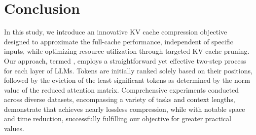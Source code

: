 \section{Conclusion}

In this study, we introduce an innovative KV cache compression objective designed to approximate the full-cache performance, independent of specific inputs, while optimizing resource utilization through targeted KV cache pruning. Our approach, termed \method, employs a straightforward yet effective two-step process for each layer of LLMs. Tokens are initially ranked solely based on their positions, followed by the eviction of the least significant tokens as determined by the norm value of the reduced attention matrix. Comprehensive experiments conducted across diverse datasets, encompassing a variety of tasks and context lengths, demonstrate that \method achieves nearly lossless compression, while with notable space and time reduction, successfully fulfilling our objective for greater practical values.
